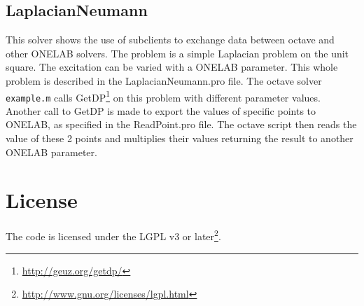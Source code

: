 \documentclass[article,english,colorback,accentcolor=tud9b,11pt]{tudreport}
\begin{document}
		\subsection{LaplacianNeumann}
		This solver shows the use of subclients to exchange data between octave and other ONELAB solvers. The problem is a simple Laplacian problem on the unit square. The excitation can be varied with a ONELAB parameter. This whole problem is described in the LaplacianNeumann.pro file. The octave solver \texttt{example.m} calls GetDP\footnote{\url{http://geuz.org/getdp/}} on this problem with different parameter values. Another call to GetDP is made to export the values of specific points to ONELAB, as specified in the ReadPoint.pro file. The octave script then reads the value of these 2 points and multiplies their values returning the result to another ONELAB parameter. 

		\section{License}
		The code is licensed under the LGPL v3 or later\footnote{\url{http://www.gnu.org/licenses/lgpl.html}}.
\end{document}
